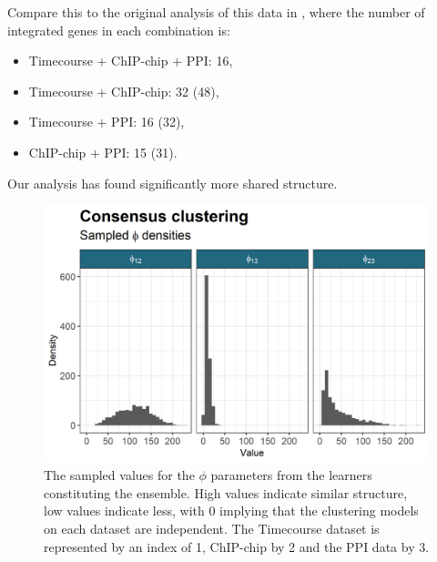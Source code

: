 \documentclass[]{article}
\begin{document}
Compare this to the original analysis of this data in \cite{kirk2012bayesian}, where the number of integrated genes in each combination is:

\begin{itemize}
	\item Timecourse + ChIP-chip + PPI: 16,
	\item Timecourse + ChIP-chip: 32 (48),
	\item Timecourse + PPI: 16 (32),
	\item ChIP-chip + PPI: 15 (31).
\end{itemize}
Our analysis has found significantly more shared structure.

\begin{figure}
	\centering
	\includegraphics[scale=0.8]{./Images/Yeast/Convergence/CCPhiDensityPlot.png}
	\caption{The sampled values for the $\phi$ parameters from the learners constituting the ensemble. High values indicate similar structure, low values indicate less, with 0 implying that the clustering models on each dataset are independent. The Timecourse dataset is represented by an index of 1, ChIP-chip by 2 and the PPI data by 3.}
	\label{fig:ccPhiDensities}
\end{figure}
\end{document}
